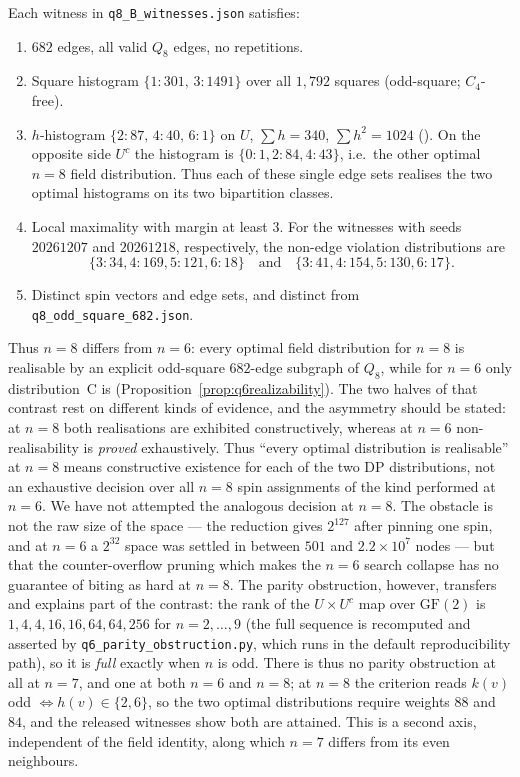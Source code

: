 \documentclass[12pt]{article}
\begin{document}
\begin{proposition}\label{prop:q8Boddsquare}
Each witness in \texttt{q8\_B\_witnesses.json} satisfies:
\begin{enumerate}[label=(\roman*)]
  \item $682$ edges, all valid $Q_8$ edges, no repetitions.
  \item Square histogram $\{1{:}301,\,3{:}1491\}$ over all
    $1{,}792$ squares (odd-square; $C_4$-free).
  \item $h$-histogram $\{2{:}87,\,4{:}40,\,6{:}1\}$ on $U$,
    $\sum h=340$, $\sum h^2=1024$ (\checkmark). On the opposite side
    $U^c$ the histogram is $\{0{:}1,2{:}84,4{:}43\}$, i.e.\ the other
    optimal $n=8$ field distribution. Thus each of these single edge sets
    realises the two optimal histograms on its two bipartition classes.
  \item Local maximality with margin at least $3$.  For the witnesses with
    seeds $20261207$ and $20261218$, respectively, the non-edge violation
    distributions are
    \[
      \{3{:}34,4{:}169,5{:}121,6{:}18\}
      \quad\text{and}\quad
      \{3{:}41,4{:}154,5{:}130,6{:}17\}.
    \]
  \item Distinct spin vectors and edge sets, and distinct from
    \texttt{q8\_odd\_square\_682.json}.
\end{enumerate}
\end{proposition}

Thus $n=8$ differs from $n=6$: every optimal field distribution for $n=8$ is
realisable by an explicit odd-square $682$-edge subgraph of $Q_8$, while for
$n=6$ only distribution~C is (Proposition~\ref{prop:q6realizability}). The two
halves of that contrast rest on different kinds of evidence, and the asymmetry
should be stated: at $n=8$ both realisations are exhibited constructively,
whereas at $n=6$ non-realisability is \emph{proved} exhaustively. Thus
``every optimal distribution is realisable'' at $n=8$ means constructive
existence for each of the two DP distributions, not an exhaustive decision
over all $n=8$ spin assignments of the kind performed at $n=6$. We have not
attempted the analogous decision at $n=8$. The obstacle is not
the raw size of the space --- the reduction gives $2^{127}$ after pinning one
spin, and at $n=6$ a $2^{32}$ space was settled in between $501$ and
$2.2\times10^{7}$ nodes --- but that the counter-overflow pruning which makes
the $n=6$ search collapse has no guarantee of biting as hard at $n=8$. The
parity obstruction, however, transfers and explains part of the contrast: the
rank of the $U\times U^{c}$ map over $\mathrm{GF}(2)$ is
$1,4,4,16,16,64,64,256$ for $n=2,\ldots,9$ (the full sequence is
recomputed and asserted by \texttt{q6\_parity\_obstruction.py}, which runs
in the default reproducibility path), so it is \emph{full} exactly when
$n$ is odd. There is thus no parity obstruction at all at $n=7$, and one at
both $n=6$ and $n=8$; at $n=8$ the criterion reads $k(v)$ odd
$\iff h(v)\in\{2,6\}$, so the two optimal distributions require weights $88$
and $84$, and the released witnesses show both are attained. This is a second
axis, independent of the field identity, along which $n=7$ differs from its
even neighbours.
\end{document}
